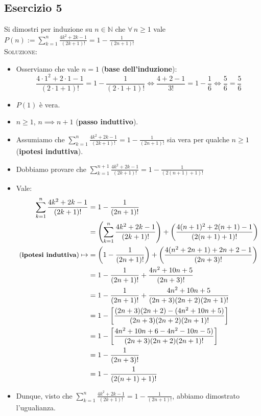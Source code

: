 \documentclass[10pt]{article}
\begin{document}
	\subsection{Esercizio 5}
	Si dimostri per induzione su $n \!\in\! \mathbb{N}$ che $\forall \, n \geq 1$ vale $P(n) := \displaystyle{\sum_{k=1}^n \frac{4k^2 
	+ 2k - 1 }{(2k+1)!} = 1 - \frac{1}{(2n + 1)!}}$
	\\ \textsc{Soluzione:}
	\begin{itemize}
	\item
	Osserviamo che vale $n=1$ (\textbf{base dell'induzione}):
	$$\frac{4\cdot 1^2 + 2\cdot 1 - 1}{(2\cdot 1 + 1)!} = 1 - \frac{1}{(2\cdot 1 + 1)!} \Longleftrightarrow \frac{4+2-1}{3!} = 1 - \frac{1}{6} \Longleftrightarrow \frac{5}{6} = \frac{5}{6}$$
	\item
	$P(1)$ è vera.
	\item
	$n \geq 1$, $n \implies n+1$ (\textbf{passo induttivo}).
	\item
	Assumiamo che $\displaystyle{\sum_{k=1}^n \frac{4k^2 
	+ 2k - 1 }{(2k+1)!} = 1 - \frac{1}{(2n + 1)!}}$ sia vera per qualche $n \geq 1$ (\textbf{ipotesi induttiva}).
	\item
	Dobbiamo provare che $\displaystyle{\sum_{k=1}^{n+1} \frac{4k^2 
	+ 2k - 1 }{(2k+1)!} = 1 - \frac{1}{(2(n+1) + 1)!}}$
	\item
	Vale:
	\begin{equation}
	\begin{split}
	\displaystyle{\sum_{k=1}^n \frac{4k^2 
	+ 2k - 1 }{(2k+1)!}}  &= \displaystyle{1 - \frac{1}{(2n + 1)!}} \\
	&= \left(\sum_{k=1}^n \frac{4k^2 
	+ 2k - 1 }{(2k+1)!}\right) + \left( \frac{4(n+1)^2 + 2(n+1) - 1}{(2(n+1)+1)!} \right) \\
	\textrm{\small{(\textbf{ipotesi induttiva})}} \mapsto &= \left( 1 - \frac{1}{(2n+1)!} \right) + \left( \frac{4(n^2 + 2n + 1) + 2n + 2 - 1}{(2n+3)!} \right) \\
	&= 1 - \frac{1}{(2n+1)!} + \frac{4n^2 + 10n + 5}{(2n+3)!} \\
	&= 1 - \frac{1}{(2n+1)!} + \frac{4n^2 + 10n + 5}{(2n+3)(2n+2)(2n+1)!} \\
	&= 1 - \left[\frac{(2n+3)(2n+2) - (4n^2 + 10n + 5)}{(2n+3)(2n+2)(2n+1)!}\right] \\
	&= 1 - \left[\frac{4n^2 + 10n + 6 - 4n^2 - 10n - 5)}{(2n+3)(2n+2)(2n+1)!}\right] \\
	&= 1 - \frac{1}{(2n+3)!} \\
	&= 1 - \frac{1}{(2(n+1)+1)!}
	\notag
	\end{split}
	\end{equation}
	\item
	Dunque, visto che $\displaystyle{\sum_{k=1}^n \frac{4k^2 
	+ 2k - 1 }{(2k+1)!} = 1 - \frac{1}{(2n + 1)!}}$, abbiamo dimostrato l'ugualianza.
	\end{itemize}
\end{document}
